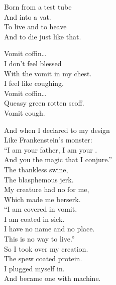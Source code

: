 Born from a test tube \\
And into a vat. \\
To live and to heave \\
And to die just like that. \\





Vomit coffin… \\

I don't feel blessed \\
With the vomit in my chest. \\
I feel like coughing. \\

Vomit coffin… \\

Queasy green rotten scoff. \\
Vomit cough. \\


And when I declared to my design \\
Like Frankenstein's monster: \\
``I am your father, I am your . \\
And you the magic that I conjure.'' \\

The thankless swine, \\
The blasphemous jerk. \\
My creature had no  for me, \\
Which made me berserk. \\

``I am covered in vomit. \\
I am coated in sick. \\
I have no name and no place. \\
This is no way to live.'' \\

So I took over my creation. \\
The spew coated protein. \\
I plugged myself in. \\
And became one with machine. \\


